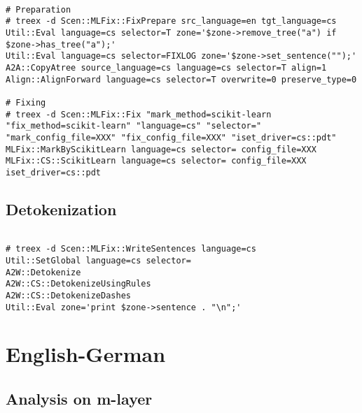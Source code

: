 \begin{lstlisting}

# Preparation
# treex -d Scen::MLFix::FixPrepare src_language=en tgt_language=cs
Util::Eval language=cs selector=T zone='$zone->remove_tree("a") if $zone->has_tree("a");'
Util::Eval language=cs selector=FIXLOG zone='$zone->set_sentence("");'
A2A::CopyAtree source_language=cs language=cs selector=T align=1
Align::AlignForward language=cs selector=T overwrite=0 preserve_type=0

# Fixing
# treex -d Scen::MLFix::Fix "mark_method=scikit-learn "fix_method=scikit-learn" "language=cs" "selector=" "mark_config_file=XXX" "fix_config_file=XXX" "iset_driver=cs::pdt"
MLFix::MarkByScikitLearn language=cs selector= config_file=XXX
MLFix::CS::ScikitLearn language=cs selector= config_file=XXX iset_driver=cs::pdt

\end{lstlisting}

\subsection{Detokenization}

\begin{lstlisting}

# treex -d Scen::MLFix::WriteSentences language=cs
Util::SetGlobal language=cs selector=
A2W::Detokenize
A2W::CS::DetokenizeUsingRules
A2W::CS::DetokenizeDashes
Util::Eval zone='print $zone->sentence . "\n";'

\end{lstlisting}

\section{English-German}

\subsection{Analysis on m-layer}

